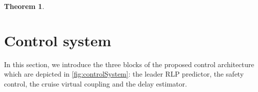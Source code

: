 \documentclass[letterpaper, 10 pt, conference]{ieeeconf}
\newcounter{Definition}
\theoremstyle{definition}
\theoremstyle{nopoint}
\newtheorem{theorem}{Theorem}[section]
\newcounter{Theorem}
\begin{document}
\begin{theorem}
%
%
%
%
%
%
\end{theorem}







\section{Control system}
 \label{sec:controlsystem}

\begin{comment}
	\textcolor{red}{Mettere qui la parte di descrizione dell'archiettura di controllo. Questa parte va aggiustata e uniformata a quello che segue. Eviterei nomi troppo pomposi. L'architettura di controllo comprende: leader RLP predictor block, safety control block, cruise virtual coupling control block (che noi ipotizziamo come switching a livelli). Questi tre blocchi sono studiati in tre diverse sezioni del paper. Qui si dà un'introduzione generale all'architettura. Questo pezzo va quindi riscritto secondo quanto sviluppato nel seguito.} 
\end{comment}


In this section, we introduce the three blocks of the proposed control architecture which are depicted in \ref{fig:controlSystem}: the leader RLP predictor, the safety control, the cruise virtual coupling and the delay estimator.
 
\end{document}
